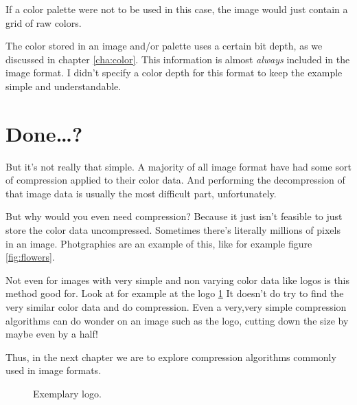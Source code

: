 \begin{refsection}
  If a color palette were not to be used in this case, the image would
  just contain a grid of raw colors.

  The color stored in an image and/or palette uses a certain bit
  depth, as we discussed in chapter \ref{cha:color}. This information
  is almost \textit{always} included in the image format. I didn't
  specify a color depth for this format to keep the example simple and
  understandable.

  \section{Done\dots?}
  \label{sec:done}

  But it's not really that simple. A majority of all image format have
  had some sort of compression applied to their color data. And
  performing the decompression of that image data is usually the
  most difficult part, unfortunately.

  But why would you even need compression?  Because it just isn't
  feasible to just store the color data uncompressed. Sometimes
  there's literally millions of pixels in an image. Photgraphies are
  an example of this, like for example figure \ref{fig:flowers}.

  Not even for images with very simple and non varying color data like
  logos is this method good for. Look at for example at the logo
  \ref{fig:logo} It doesn't do try to find the very similar color data
  and do compression. Even a very,very simple compression algorithms
  can do wonder on an image such as the logo,  cutting down the size by
  maybe even by a half!

  Thus, in the next chapter we are to explore compression algorithms
  commonly used in image formats.


  \begin{figure}[h!]
    \centering
    \newcommand{\shieldcolor}{red}
    \caption{Exemplary logo.}
    \label{fig:logo}
  \end{figure}


\end{refsection}
